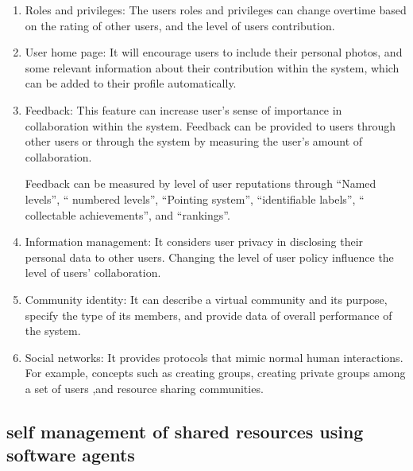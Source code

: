 \documentclass [12pt]{article} \usepackage{multicol}
\begin{document}
		\begin{enumerate} \item Roles and privileges: The users
	roles and privileges can change overtime based on the rating
	of other users, and the level of users contribution.
	 \item User home page: It will encourage users to include their
	personal photos, and some relevant information about their
	contribution within the system, which can be added to their
	profile automatically.

		\item Feedback: This feature can increase user's sense of
	importance in collaboration within the system. Feedback can
	be provided to users through other users or through the system by
	measuring the user's amount of collaboration.
	
	 Feedback can be measured by level of user reputations through
	“Named levels”, “ numbered levels”, “Pointing system”, “identifiable labels”, “ collectable achievements”, and
	“rankings”.

		\item Information management: It considers user
	privacy in disclosing their personal data to other users.
	Changing the level of user policy influence the level of
	users' collaboration. 
	\item Community identity: It can describe a virtual community and its purpose,
	specify the type of its members, and provide data of overall performance of the system. 
	\item Social networks:
	It provides protocols that mimic normal human interactions. For
	example, concepts such as creating groups, creating private
	groups among a set of users ,and resource sharing communities.
	 \end{enumerate}


	


\subsection{self management of shared resources using software agents }
\end{document}
